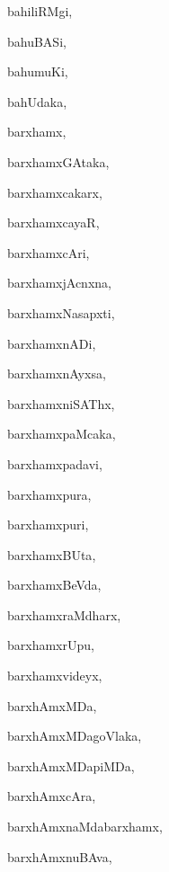 \begin{multicols}{3}
{\noindent
{bahiliRMgi}, \pageref{bahiliRMgi}

\noindent
{bahuBASi}, \pageref{bahuBASi}

\noindent
{bahumuKi}, \pageref{bahumuKi}

\noindent
{bahUdaka}, \pageref{bahUdaka}

\noindent
{barxhamx}, \pageref{barxhamx}

\noindent
{barxhamxGAtaka}, \pageref{barxhamxGAtaka}

\noindent
{barxhamxcakarx}, \pageref{barxhamxcakarx}

\noindent
{barxhamxcayaR}, \pageref{barxhamxcayaR}

\noindent
{barxhamxcAri}, \pageref{barxhamxcAri}

\noindent
{barxhamxjAcnxna}, \pageref{barxhamxjAcnxna}

\noindent
{barxhamxNasapxti}, \pageref{barxhamxNasapxti}

\noindent
{barxhamxnADi}, \pageref{barxhamxnADi}

\noindent
{barxhamxnAyxsa}, \pageref{barxhamxnAyxsa}

\noindent
{barxhamxniSAThx}, \pageref{barxhamxniSAThx}

\noindent
{barxhamxpaMcaka}, \pageref{barxhamxpaMcaka}

\noindent
{barxhamxpadavi}, \pageref{barxhamxpadavi}

\noindent
{barxhamxpura}, \pageref{barxhamxpura}

\noindent
{barxhamxpuri}, \pageref{barxhamxpuri}

\noindent
{barxhamxBUta}, \pageref{barxhamxBUta}

\noindent
{barxhamxBeVda}, \pageref{barxhamxBeVda}

\noindent
{barxhamxraMdharx}, \pageref{barxhamxraMdharx}

\noindent
{barxhamxrUpu}, \pageref{barxhamxrUpu}

\noindent
{barxhamxvideyx}, \pageref{barxhamxvideyx}

\noindent
{barxhAmxMDa}, \pageref{barxhAmxMDa}

\noindent
{barxhAmxMDagoVlaka}, \pageref{barxhAmxMDagoVlaka}

\noindent
{barxhAmxMDapiMDa}, \pageref{barxhAmxMDapiMDa}

\noindent
{barxhAmxcAra}, \pageref{barxhAmxcAra}

\noindent
{barxhAmxnaMdabarxhamx}, \pageref{barxhAmxnaMdabarxhamx}

\noindent
{barxhAmxnuBAva}, \pageref{barxhAmxnuBAva}

}
\end{multicols}
